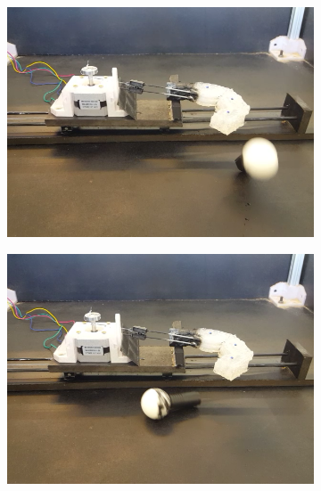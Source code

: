 \documentclass[letterpaper, 10 pt, conference]{ieeeconf}  %
\begin{document}
\begin{figure}[htpb]
\begin{subfigure}[b]{0.72in}
                \includegraphics[width=\textwidth]{figures/finger/finger4.png}
        \end{subfigure}
        \begin{subfigure}[b]{0.72in}                            
                \centering
                \includegraphics[width=\textwidth]{figures/finger/finger5.png}
        \end{subfigure}
        

\end{figure}
\end{document}
